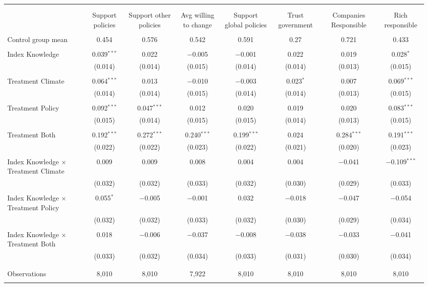 
\begin{tabular}{@{\extracolsep{5pt}}lccccccc} 
\\[-1.8ex]\hline 
\hline \\[-1.8ex] 
\\[-1.8ex] & Support policies & Support other policies & Avg willing to change & Support global policies & Trust government & Companies Responsible & Rich responsible \\ 
\hline \\[-1.8ex] 
 Control group mean & 0.454 & 0.576 & 0.542 & 0.591 & 0.27 & 0.721 & 0.433  \\ \hline \\[-1.8ex] Index Knowledge & 0.039$^{***}$ & 0.022 & $-$0.005 & $-$0.001 & 0.022 & 0.019 & 0.028$^{*}$ \\ 
  & (0.014) & (0.014) & (0.015) & (0.014) & (0.014) & (0.013) & (0.015) \\ 
  & & & & & & & \\ 
 Treatment Climate & 0.064$^{***}$ & 0.013 & $-$0.010 & $-$0.003 & 0.023$^{*}$ & 0.007 & 0.069$^{***}$ \\ 
  & (0.014) & (0.014) & (0.015) & (0.014) & (0.014) & (0.013) & (0.015) \\ 
  & & & & & & & \\ 
 Treatment Policy & 0.092$^{***}$ & 0.047$^{***}$ & 0.012 & 0.020 & 0.019 & 0.020 & 0.083$^{***}$ \\ 
  & (0.015) & (0.014) & (0.015) & (0.015) & (0.014) & (0.013) & (0.015) \\ 
  & & & & & & & \\ 
 Treatment Both & 0.192$^{***}$ & 0.272$^{***}$ & 0.240$^{***}$ & 0.199$^{***}$ & 0.024 & 0.284$^{***}$ & 0.191$^{***}$ \\ 
  & (0.022) & (0.022) & (0.023) & (0.022) & (0.021) & (0.020) & (0.023) \\ 
  & & & & & & & \\ 
 Index Knowledge $\times$ Treatment Climate & 0.009 & 0.009 & 0.008 & 0.004 & 0.004 & $-$0.041 & $-$0.109$^{***}$ \\ 
  & (0.032) & (0.032) & (0.033) & (0.032) & (0.030) & (0.029) & (0.033) \\ 
  & & & & & & & \\ 
 Index Knowledge $\times$ Treatment Policy & 0.055$^{*}$ & $-$0.005 & $-$0.001 & 0.032 & $-$0.018 & $-$0.047 & $-$0.054 \\ 
  & (0.032) & (0.032) & (0.033) & (0.032) & (0.030) & (0.029) & (0.034) \\ 
  & & & & & & & \\ 
 Index Knowledge $\times$ Treatment Both & 0.018 & $-$0.006 & $-$0.037 & $-$0.008 & $-$0.038 & $-$0.033 & $-$0.041 \\ 
  & (0.033) & (0.032) & (0.034) & (0.033) & (0.031) & (0.030) & (0.034) \\ 
  & & & & & & & \\ 
\hline \\[-1.8ex] 

Observations & 8,010 & 8,010 & 7,922 & 8,010 & 8,010 & 8,010 & 8,010 \\ 
\hline 
\hline \\[-1.8ex] 
\end{tabular} 